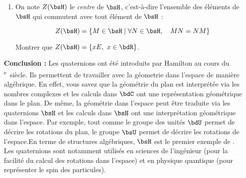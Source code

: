 \documentclass[a4paper,french,bookmarks]{article}
\begin{document}
\begin{enumerate}
    \item On note $Z(\bsH)$ le \textit{\color{main1}centre} de $\bsH$, c'est-à-dire l'ensemble des éléments de $\bsH$ qui commutent avec tout élément de $\bsH$ :
    
    \begin{equation}
        Z(\bsH) = \{ M \in \bsH \mid \forall N \in \bsH, \quad MN = NM\}
    \end{equation}
    
    Montrer que $Z(\bsH) = \{ xE,\ x \in \bdR\}$.
    
    
\end{enumerate}\hfill\newline

\textsf{\textbf{Conclusion :}} Les quaternions ont été introduits par Hamilton au cours du \textsc{}\textsuperscript{e}~siècle. Ils permettent de travailler avec la géometrie dans l'espace de manière algébrique. En effet, vous savez que la géométrie du plan est interprétée via les nombres complexes et les calculs dans $\bdC$ ont une représentation géométrique dans le plan. De même, la géométrie dans l'espace peut être traduite via les quaternions $\bsH$ et les calculs dans $\bsH$ ont une interprétation géométrique dans l'espace. Par exemple, tout comme le groupe des unités $\bdU$ permet de décrire les rotations du plan, le groupe $\bsU$ permet de décrire les rotations de l'espace.En terme de structures algébriques, $\bsH$ est le premier exemple de .\\[-10pt]

Les quaternions sont notamment utilisés en sciences de l'ingénieur (pour la facilité du calcul des rotations dans l'espace) et en physique quantique (pour représenter le spin des particules).
\end{document}
